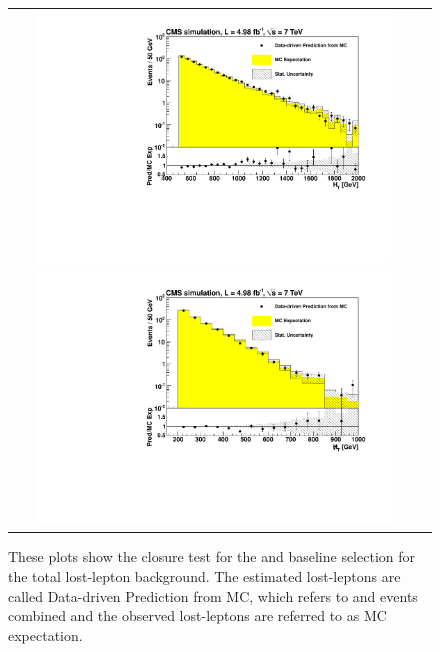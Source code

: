 % 
\begin{figure}[tbhn]
\begin{center}
\begin{tabular}{cc}
\includegraphics[width=0.90\textwidth]{lostlepton/plots/ANplots/Closure_HT.pdf}\\
\includegraphics[width=0.90\textwidth]{lostlepton/plots/ANplots/Closure_MHT.pdf}

\end{tabular}
\end{center}
\caption{These plots show the closure test for the \HT and \MHT baseline selection for the total lost-lepton background. The estimated lost-leptons are called Data-driven Prediction from MC, which refers to \ttbar and \wpj events combined and the observed lost-leptons are referred to as MC expectation.}
\label{fig:closure}
\end{figure}





